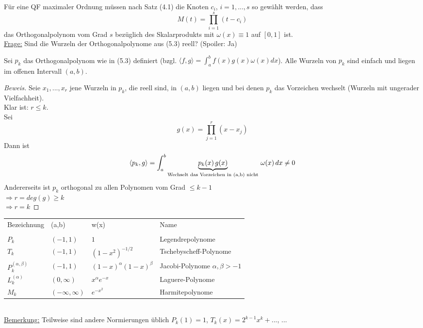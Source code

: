 Für eine QF maximaler Ordnung müssen nach Satz (4.1) die Knoten $c_i$, $i=1, ...,s$ so gewählt werden, dass 
$$M(t) = \prod_{i=1}^s(t-c_i)$$
das Orthogonalpolynom vom Grad $s$ bezüglich des Skalarprodukts mit $\omega(x) \equiv 1$ auf $[0,1]$ ist. \\
\underline{Frage:} Sind die Wurzeln der Orthogonalpolynome aus (5.3) reell? (Spoiler: Ja)

\begin{theorem}
Sei $p_k$ das Orthogonalpolynom wie in (5.3) definiert (bzgl. $\langle f, g \rangle = \int_a^b f(x)g(x)\omega(x)dx$). Alle Wurzeln von $p_k$ sind einfach und liegen im offenen Intervall $(a,b)$.

\begin{proof}[Beweis]
Seie $x_1, ..., x_r$ jene Wurzeln in $p_k$, die reell sind, in $(a, b)$ liegen und bei denen $p_k$ das Vorzeichen wechselt (Wurzeln mit ungerader Vielfachheit). \\
Klar ist: $r \leq k$. \\
Sei 
$$g(x) = \prod_{j=1}^r (x-x_j)$$ 
Dann ist 
$$ \langle p_k, g \rangle = \int_a^b \underbrace{p_k(x) \thinspace g(x)}_{\text{Wechselt das Vorzeichen in (a,b) nicht}} \thinspace \omega(x) \thinspace dx \neq 0$$
Andererseits ist $p_k$ orthogonal zu allen Polynomen vom Grad $\leq k-1$ \\
$\Rightarrow r = deg(g) \geq k$ \\
$\Rightarrow r=k$
\end{proof}
\end{theorem}

\begin{example}
\begin{tabular}{llll}
 
Bezeichnung & (a,b) & w(x) & Name\\
 
& & & \\

$P_k$ & $(-1,1)$ & $1$ & Legendrepolynome \\

$T_k$ & $(-1,1)$ & $(1-x^2)^{-1/2}$ & Tschebyscheff-Polynome \\

$P_k^{(\alpha, \beta)}$ & $(-1,1)$ & $(1-x)^{\alpha}(1-x)^{\beta}$ & Jacobi-Polynome $\alpha, \beta > -1$ \\

$L_k^{(\alpha)}$ & $(0, \infty)$ & $x^{\alpha} e^{-x}$ & Laguere-Polynome \\

$M_k$ & $(-\infty,\infty)$ & $e^{-x^2}$ & Harmitepolynome \\

\end{tabular}\\
\underline{Bemerkung:} Teilweise sind andere Normierungen üblich $P_k(1) = 1$, $T_k(x) = 2^{k-1} x^k + ...$, ...
\end{example}